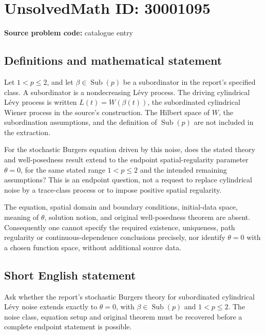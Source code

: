 \documentclass[11pt]{article}
\begin{document}
\section*{UnsolvedMath ID: 30001095}
\textbf{Source problem code:} catalogue entry
\subsection{Definitions and mathematical statement}
Let \(1<p\leq2\), and let \(\beta\in\operatorname{Sub}(p)\) be a subordinator in the report's specified class. A subordinator is a nondecreasing Lévy process. The driving cylindrical Lévy process is written \(L(t)=W(\beta(t))\), the subordinated cylindrical Wiener process in the source's construction. The Hilbert space of \(W\), the subordination assumptions, and the definition of \(\operatorname{Sub}(p)\) are not included in the extraction.

For the stochastic Burgers equation driven by this noise, does the stated theory and well-posedness result extend to the endpoint spatial-regularity parameter \(\theta=0\), for the same stated range \(1<p\leq2\) and the intended remaining assumptions? This is an endpoint question, not a request to replace cylindrical noise by a trace-class process or to impose positive spatial regularity.

The equation, spatial domain and boundary conditions, initial-data space, meaning of \(\theta\), solution notion, and original well-posedness theorem are absent. Consequently one cannot specify the required existence, uniqueness, path regularity or continuous-dependence conclusions precisely, nor identify \(\theta=0\) with a chosen function space, without additional source data.
\subsection{Short English statement}
Ask whether the report's stochastic Burgers theory for subordinated cylindrical Lévy noise extends exactly to \(\theta=0\), with \(\beta\in\operatorname{Sub}(p)\) and \(1<p\leq2\). The noise class, equation setup and original theorem must be recovered before a complete endpoint statement is possible.
\end{document}
